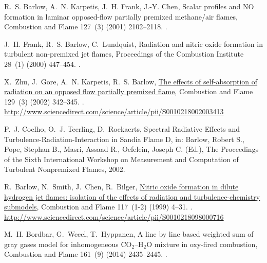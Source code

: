 \documentclass[preprint,12pt]{elsarticle}
\begin{document}
\begin{thebibliography}{10}
R.~S. Barlow, A.~N. Karpetis, J.~H. Frank, J.-Y. Chen, {Scalar profiles and
{NO} formation in laminar opposed-flow partially premixed methane/air
flames}, {Combustion and Flame} 127~(3) (2001) 2102--2118.
\newblock \href {http://dx.doi.org/10.1016/S0010-2180(01)00313-3}
  {}.

J.~H. Frank, R.~S. Barlow, C.~Lundquist, {Radiation and nitric oxide formation
in turbulent non-premixed jet flames}, {Proceedings of the Combustion
Institute} 28~(1) (2000) 447--454.
\newblock \href {http://dx.doi.org/10.1016/S0082-0784(00)80242-8}
  {}.

X.~Zhu, J.~Gore, A.~N. Karpetis, R.~S. Barlow,
\href{http://www.sciencedirect.com/science/article/pii/S0010218002003413}{{The
effects of self-absorption of radiation on an opposed flow partially premixed
flame}}, {Combustion and Flame} 129~(3) (2002) 342--345.
\newblock \href {http://dx.doi.org/10.1016/S0010-2180(02)00341-3}
  {}.
\newline\urlprefix\url{http://www.sciencedirect.com/science/article/pii/S0010218002003413}

P.~J. Coelho, O.~J. Teerling, D.~Roekaerts, {Spectral Radiative Effects and
Turbulence-Radiation-Interaction in Sandia Flame {D}}, in: {Barlow, Robert
S., Pope, Stephan B., Masri, Assaad R., Oefelein, Joseph C.} (Ed.), {The
Proceedings of the Sixth International Workshop on Measurement and
Computation of Turbulent Nonpremixed Flames}, 2002.

R.~Barlow, N.~Smith, J.~Chen, R.~Bilger,
\href{http://www.sciencedirect.com/science/article/pii/S0010218098000716}{{Nitric
oxide formation in dilute hydrogen jet flames: isolation of the effects of
radiation and turbulence-chemistry submodels}}, {Combustion and Flame}
117~(1-2) (1999) 4--31.
\newblock \href {http://dx.doi.org/10.1016/S0010-2180(98)00071-6}
  {}.
\newline\urlprefix\url{http://www.sciencedirect.com/science/article/pii/S0010218098000716}

M.~H. Bordbar, G.~Wecel, T.~Hyppanen, {A line by line based weighted sum of
gray gases model for inhomogeneous {CO$_2$–H$_2$O} mixture in oxy-fired
combustion}, {Combustion and Flame} 161~(9) (2014) 2435--2445.
\newblock \href {http://dx.doi.org/10.1016/j.combustflame.2014.03.013}
  {}.


\end{thebibliography}
\end{document}
